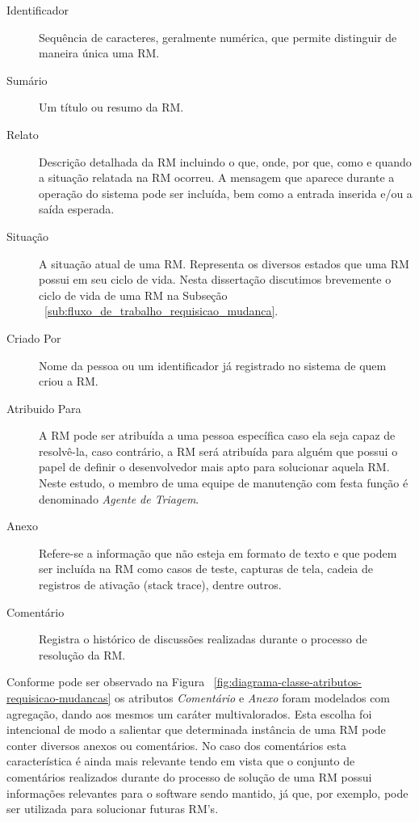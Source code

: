 \begin{description}
	\item [Identificador] Sequência de caracteres,  geralmente numérica,  que
		permite distinguir de maneira única uma RM.
	\item [Sumário] Um título ou resumo da RM.
	\item [Relato] Descrição detalhada da RM incluindo o que, onde, por que,
		como e quando a situação relatada na RM ocorreu. A mensagem que aparece
		durante a operação do sistema pode ser incluída, bem como a entrada
		inserida e/ou a saída esperada.
	\item [Situação] A situação atual de uma RM\@. Representa os diversos
		estados que uma RM possui em seu ciclo de vida. Nesta dissertação
		discutimos brevemente o ciclo de vida de uma RM na Subseção
		~\ref{sub:fluxo_de_trabalho_requisicao_mudanca}.
	\item [Criado Por] Nome da pessoa ou um identificador já registrado no
		sistema de quem criou a RM\@.
	\item [Atribuido Para] A RM pode ser atribuída a uma pessoa específica caso
		ela seja capaz de resolvê-la, caso contrário, a RM será atribuída para
		alguém que possui o papel de definir o desenvolvedor mais apto para
		solucionar aquela RM. Neste estudo, o membro de uma equipe de manutenção
		com festa função é denominado \textit{Agente de Triagem}.
	\item [Anexo] Refere-se a informação que não esteja em formato de texto e
		que podem ser incluída na RM como casos de teste, capturas de tela,
		cadeia de registros de ativação (stack trace), dentre outros.
	\item [Comentário] Registra o histórico de discussões realizadas durante o
		processo de resolução da RM\@.
\end{description}


Conforme pode ser observado na Figura
~\ref{fig:diagrama-classe-atributos-requisicao-mudancas} os atributos
\textit{Comentário} e \textit{Anexo} foram modelados com agregação, dando aos
mesmos um caráter multivalorados. Esta escolha foi intencional de modo a
salientar que determinada instância de uma RM pode conter diversos anexos ou
comentários. No caso dos comentários esta característica é ainda mais relevante
tendo em vista que o conjunto de comentários realizados durante do processo de
solução de uma RM possui informações relevantes para o software sendo mantido,
já que, por exemplo, pode ser utilizada para solucionar futuras RM's.

